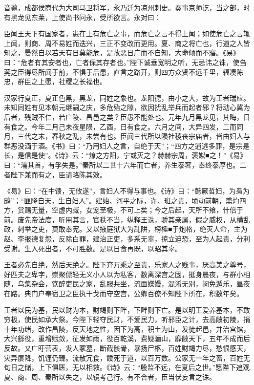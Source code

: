 \documentclass[]{article}
\begin{document}
音薨，成都侯商代为大司马卫将军，永乃迁为凉州刺史。奏事京师讫，当之部，时有黑龙见东莱，上使尚书问永，受所欲言。永对曰：

臣闻王天下有国家者，患在上有危亡之事，而危亡之言不得上闻；如使危亡之言辄上闻，则商、周不易姓而迭兴，三正不变改而更用。夏、商之将亡也，行道之人皆知之，晏然自以若天有日莫能危，是故恶日广而不自知，大命倾而不寤。《易》曰：``危者有其安者也，亡者保其存者也。''陛下诚垂宽明之听，无忌讳之诛，使刍荛之臣得尽所闻于前，不惧于后患，直言之路开，则四方众贤不远千里，辐凑陈忠，群臣之上愿，社稷之长福也。

汉家行夏正，夏正色黑，黑龙，同姓之象也。龙阳德，由小之大，故为王者瑞应。未知同姓有见本朝元继嗣之庆，多危殆之隙，欲因扰乱举兵而起者邪？将动心冀为后者，残贼不仁，若广陵、昌邑之类？臣愚不能处也。元年九月黑龙见，其晦，日有食之。今年二月己未夜星陨，乙酉，日有食之。六月之间，大异四发，二而同月，三代之末，春秋之乱，未尝有也。臣闻三代所以陨社稷丧宗庙者，皆由妇人与群恶没湎于酒。《书》曰：``乃用妇人之言，自绝于天''；``四方之逋逃多罪，是宗是长，是信是使''。《诗》云：``燎之方阳，宁或灭之？赫赫宗周，褒姒■之！''《易》曰：``濡其首，有孚失是。''秦所以二世十六年而亡者，养生泰奢，奉终泰厚也。二者陛下兼而有之，臣请略陈其效。

《易》曰：``在中馈，无攸遂''，言妇人不得与事也。《诗》曰：``懿厥哲妇，为枭为鸱''；``匪降自天，生自妇人''。建始、河平之际，许、班之贵，顷动前朝，熏灼四方，赏赐无量，空虚内臧，女宠至极，不可上矣；今之后起，天所不飨，什倍于前。废先帝法度，听用其言，官秩不当，纵释王诛，骄其亲属，假之威权，从横乱政，刺举之吏，莫敢奉宪。又以掖庭狱大为乱阱，榜棰■于炮格，绝灭人命，主为赵、李报德复怨，反除白罪，建治正吏，多系无辜，掠立迫恐，至为人起责，分利受谢。生入死出者，不可胜数。是以日食再既，以昭其辜。

王者必先自绝，然后天绝之。陛下弃万乘之至贵，乐家人之贱事，厌高美之尊号，好匹夫之卑字，崇聚僄轻无义小人以为私客，数离深宫之固，挺身晨夜，与群小相随，乌集杂会，饮醉吏民之家，乱服共坐，流面媟嫚，混淆无别，闵免遁乐，昼夜在路。典门户奉宿卫之臣执干戈而守空宫，公卿百僚不知陛下所在，积数年矣。

王者以民为基，民以财为本，财竭则下畔，下畔则下亡。是以明王爱养基本，不敢穷极，使民如承大祭。今陛下轻夺民财，不爱民力，听邪臣之计，去高敞初陵，捐十年功绪，改作昌陵，反天地之性，因下为高，积土为山，发徒起邑，并治宫馆，大兴繇役，重增赋敛，征发如雨，役百乾溪，费疑骊山，靡敝天下，五年不成而后反故。又广盱营表，发人冢墓，断截骸骨，暴扬尸柩，百姓财竭力尽，愁恨感天，灾异屡降，饥馑仍臻。流散冗食，餧死于道，以百万数。公家无一年之畜，百姓无旬日之储，上下俱匮，无以相救。《诗》云：``殷监不远，在夏后之世。''愿陛下追观夏、商、周、秦所以失之，以镜考己行。有不合者，臣当伏妄言之诛。
\end{document}
